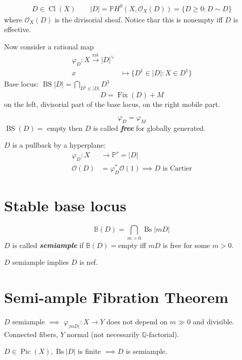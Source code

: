 \begin{align*}
	D\in\operatorname{Cl}(X)\qquad |D| =\mathbb{P}H^{0}(X,\mathcal{O}_X(D))=\{D\geq 0:D\sim D\}
\end{align*}
where $\mathcal{O}_X(D)$ is the divisorial sheaf. Notice thar this is nonempty iff $D$ is effective.

Now consider a rational map
\begin{align*}
	\varphi _D:X\overset{\operatorname{rat}}{\longrightarrow}|D|^\vee\\
	x &\longmapsto \{D^1\in |D| :X\in D^1\}
\end{align*}
Base locus: $\operatorname{BS}|D| =\bigcap_{D^1\in |D|}D^1$ 
\[D=\operatorname{Fix}(D)+M\]
on the left, divisorial part of the base locus, on the right mobile part.

\[\varphi_D=\varphi_M\]
$\operatorname{BS}(D)=$ empty then $D$ is called \textit{\textbf{free}} for globally generated.

 $D$ is a pullback by a hyperplane:
 \begin{align*}
 	\varphi_D: X &\longrightarrow \mathbb{P}^r=|D| \\
 	\mathcal{O}(D)&=\varphi^*_D\mathcal{O}(1)\implies D \text{ is Cartier} 
 \end{align*}

 \section{Stable base locus}
 \[\mathbb{B}(D)=\bigcap_{m>0}\operatorname{Bs}|mD|\]
 $D$ is called \textit{\textbf{semiample}} if  $\mathbb{B}(D)=$empty iff $mD$ is free for some $m>0$.

  $D$ semiample implies $D$ is nef.

 \section{Semi-ample Fibration Theorem}

 \begin{thm}
 	$D$ semiample $\implies $ $\varphi_{|mD|}:X\to Y$ does not depend on $m\gg 0$ and divisible. Connected fibers,  $Y$ normal (not necessarily $\mathbb{Q}$-factorial).
 \end{thm}

 \begin{thm}[Zariski]\leavevmode
 	$D\in\operatorname{Pic}(X), \operatorname{Bs}|D|$ is finite $\implies $$D$ is semiample.
 \end{thm}

